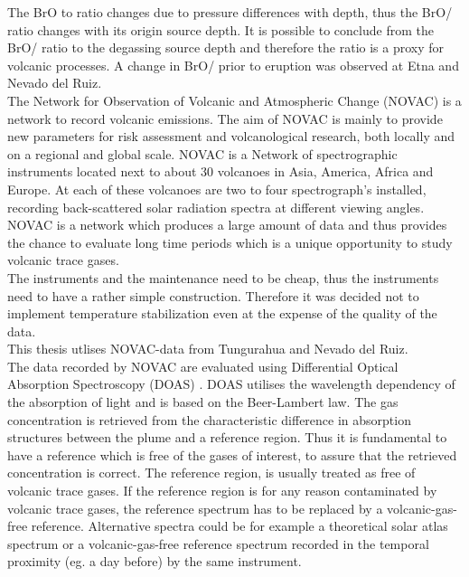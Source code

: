 The BrO to  ratio changes due to pressure differences with depth, thus the BrO/ ratio changes with its origin source depth. It is possible to conclude from the BrO/ ratio to the degassing source depth and therefore the ratio is a proxy for volcanic processes. A change in BrO/ prior to eruption was observed at Etna and Nevado del Ruiz.\\
%
\newline
%
The Network for Observation of Volcanic and Atmospheric Change (NOVAC) is a network to record volcanic emissions. The aim of NOVAC is mainly to provide new parameters for risk assessment and volcanological research, both locally and on a regional and global scale.
NOVAC is a Network of spectrographic instruments located next to about 30 volcanoes in Asia, America, Africa and Europe. At each of these volcanoes are two to four spectrograph's installed, recording back-scattered solar radiation spectra at different viewing angles.\\
NOVAC is a network which produces a large amount of data and thus provides the chance to evaluate long time periods which is a unique opportunity to study volcanic trace gases.\\
The instruments and the maintenance need to be cheap, thus the instruments need to have a rather simple construction. Therefore it was decided not to implement temperature stabilization even at the expense of the quality of the data.\\This thesis utlises NOVAC-data from Tungurahua and Nevado del Ruiz.\\
%
\newline
%
The data recorded by NOVAC are evaluated using Differential Optical Absorption Spectroscopy (DOAS) \citet{platt2008differential}. DOAS utilises the wavelength dependency of the absorption of light and is based on the Beer-Lambert law. The gas concentration is retrieved from the characteristic difference in absorption structures between the plume and a reference region. Thus it is fundamental to have a reference which is free of the gases of interest, to assure that the retrieved concentration is correct.
%
\newline
%
The reference region, is usually treated as free of
volcanic trace gases. If the reference region is for any reason
contaminated by volcanic trace gases, the reference spectrum has to be
replaced by a volcanic-gas-free reference. Alternative spectra could be for example a
theoretical solar atlas spectrum or a volcanic-gas-free reference
spectrum recorded in the temporal proximity (eg. a day before) by the same instrument.
